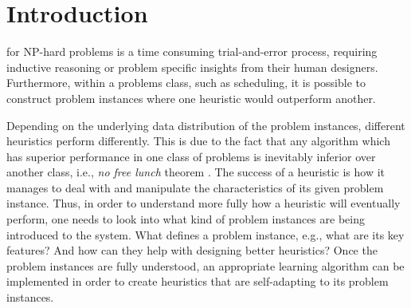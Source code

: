 

\chapter{Introduction}\label{ch:introduction} 

 for NP-hard problems is a time consuming trial-and-error process, requiring inductive reasoning or problem specific insights from their human designers. Furthermore, within a problems class, such as scheduling, it is possible to construct problem instances where one heuristic would outperform another. 

Depending on the underlying data distribution of the problem instances, different heuristics perform differently. This is due to the fact that any algorithm which has superior performance in one class of problems is inevitably inferior over another class, i.e., \emph{no free lunch} theorem \citep{Wolpert97nofree}. 
The success of a heuristic is how it manages to deal with and manipulate the 
characteristics of its given problem instance. Thus, in order to understand 
more fully how a heuristic will eventually perform, one needs to look into what 
kind of problem instances are being introduced to the system. What defines a 
problem instance, e.g., what are its key features? And how can they help with 
designing better heuristics? Once the problem instances are fully understood, 
an appropriate learning algorithm can be implemented in order to create 
heuristics that are  self-adapting to its problem instances.

